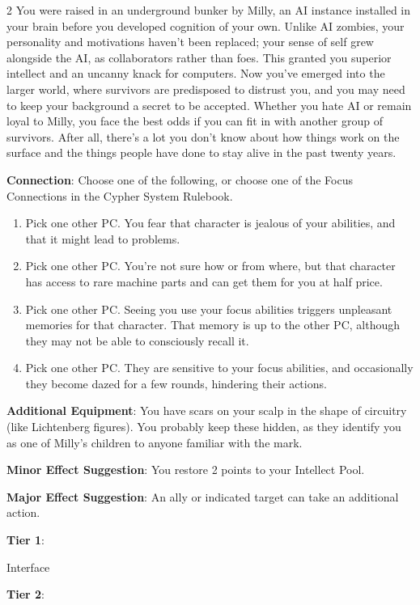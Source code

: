 \begin{multicols}{2}
You were raised in an underground bunker by Milly, an AI instance installed in your  brain before you developed cognition of your own. Unlike AI zombies, your personality and motivations haven’t been replaced; your sense of self grew alongside the AI, as collaborators rather than foes. This granted you superior intellect and an uncanny knack for computers. Now you’ve emerged into the larger world, where survivors are predisposed to distrust you, and you may need to keep your background a secret to be accepted. Whether you hate AI or remain loyal to Milly, you face the best odds if you can fit in with another group of survivors. After all, there’s a lot you don’t know about how things work on the surface and the things people have done to stay alive in the past twenty years.

\textbf{Connection}: Choose one of the following, or choose one of the Focus Connections in the Cypher System Rulebook.

\begin{enumerate}
\item Pick one other PC. You fear that character is jealous of your abilities, and that it might lead to problems.
\item Pick one other PC. You’re not sure how or from where, but that character has access to rare machine parts and can get them for you at half price.
\item Pick one other PC. Seeing you use your focus abilities triggers unpleasant memories for that character. That memory is up to the other PC, although they may not be able to consciously recall it.
\item Pick one other PC. They are sensitive to your focus abilities, and occasionally they become dazed for a few rounds, hindering their actions.
\end{enumerate}

\textbf{Additional Equipment}: You have scars on your scalp in the shape of circuitry (like Lichtenberg figures). You probably keep these hidden, as they identify you as one of Milly’s children to anyone familiar with the mark.

\textbf{Minor Effect Suggestion}: You restore 2 points to your Intellect Pool.

\textbf{Major Effect Suggestion}: An ally or indicated target can take an additional action.

\textbf{Tier 1}:
 
Interface

\textbf{Tier 2}:


\end{multicols}
